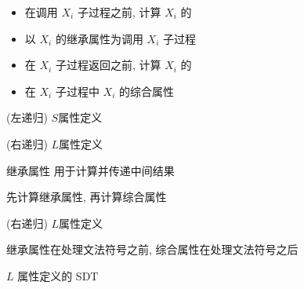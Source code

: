 \begin{frame}{}
  \begin{center}

    \vspace{0.80cm}
    \begin{itemize}
      \centering
      \setlength{\itemsep}{12pt}
      \item 在调用 $X_{i}$ 子过程之前, 计算 $X_{i}$ 的
      \item 以 $X_{i}$ 的继承属性为调用 $X_{i}$ 子过程
      \item 在 $X_{i}$ 子过程返回之前, 计算 $X_{i}$ 的
      \item 在 $X_{i}$ 子过程中 $X_{i}$ 的综合属性
    \end{itemize}
  \end{center}
\end{frame}

\begin{frame}{}
  \begin{center}
    (左递归) $S$属性定义
    \vspace{-0.50cm}
    

    \pause
    \vspace{0.80cm}
    (右递归) $L$属性定义
    \vspace{-0.50cm}
    
  \end{center}
\end{frame}

\begin{frame}{}
  \begin{center}
    继承属性  用于计算并传递中间结果

    \vspace{0.50cm}

    \vspace{0.50cm}
    先计算继承属性, 再计算综合属性
  \end{center}
\end{frame}

\begin{frame}{}
  \begin{center}
    (右递归) $L$属性定义
    \vspace{-0.50cm}
    

    \vspace{0.30cm}
     继承属性在处理文法符号之前, 综合属性在处理文法符号之后

    \pause
    \vspace{0.50cm}
    $L$ 属性定义的 SDT
    \vspace{-0.50cm}
    
  \end{center}
\end{frame}

